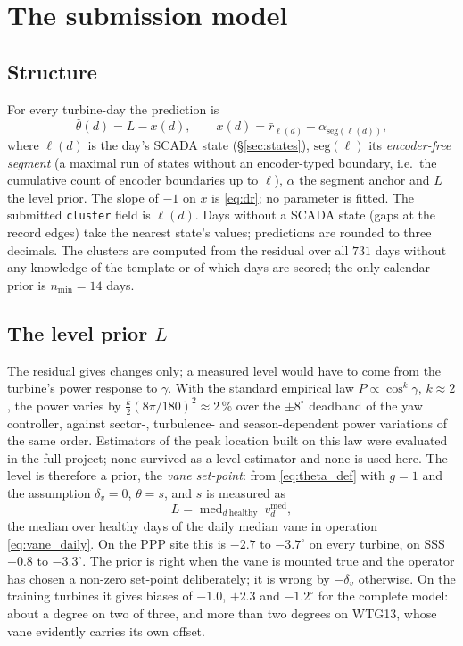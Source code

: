 \documentclass[11pt,a4paper]{article}
\theoremstyle{remark}
\newcommand{\med}{\operatorname{med}}
\newcommand{\dg}{^{\circ}}
\newcommand{\code}[1]{\texttt{#1}}
\begin{document}
\section{The submission model}\label{sec:step4}
\subsection{Structure}
For every turbine-day the prediction is
\begin{equation}
  \hat\theta(d) = L - x(d),\qquad
  x(d) = \bar r_{\ell(d)} - \alpha_{\mathrm{seg}(\ell(d))},
  \label{eq:submission}
\end{equation}
where $\ell(d)$ is the day's SCADA state (\S\ref{sec:states}),
$\mathrm{seg}(\ell)$ its \emph{encoder-free segment} (a maximal run of states
without an encoder-typed boundary, i.e.\ the cumulative count of encoder
boundaries up to $\ell$), $\alpha$ the segment anchor and $L$ the level prior.
The slope of $-1$ on $x$ is \eqref{eq:dr}; no parameter is fitted.
The submitted \code{cluster} field is $\ell(d)$. Days without a SCADA state
(gaps at the record edges) take the nearest state's values; predictions are
rounded to three decimals. The clusters are computed from the residual over
all $731$ days without any knowledge of the template or of which days are
scored; the only calendar prior is $n_{\min}=14$ days.

\subsection{The level prior $L$}
The residual gives changes only; a measured level would have to come from the
turbine's power response to $\gamma$. With the standard empirical law
$P\propto\cos^k\gamma$, $k\approx2$, the power varies by
$\tfrac{k}{2}(8\pi/180)^2\approx2\,\%$ over the $\pm8\dg$ deadband of the yaw
controller, against sector-, turbulence- and season-dependent power variations
of the same order. Estimators of the peak location built on this law were
evaluated in the full project; none survived as a level estimator and none is
used here. The level is therefore a prior, the
\emph{vane set-point}: from \eqref{eq:theta_def} with $g=1$ and the assumption
$\delta_v=0$, $\theta=s$, and $s$ is measured as
\begin{equation}
  L = \med_{d\ \text{healthy}}\ v^{\med}_d ,
  \label{eq:L}
\end{equation}
the median over healthy days of the daily median vane in operation
\eqref{eq:vane_daily}. On the PPP site this is $-2.7$ to $-3.7\dg$ on every
turbine, on SSS $-0.8$ to $-3.3\dg$. The prior is right when the vane is
mounted true and the operator has chosen a non-zero set-point deliberately; it
is wrong by $-\delta_v$ otherwise. On the training turbines it gives biases of
$-1.0$, $+2.3$ and $-1.2\dg$ for the complete model: about a degree on two of
three, and more than two degrees on WTG13, whose vane evidently carries its own
offset.
\end{document}
